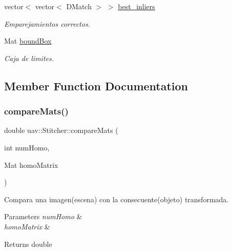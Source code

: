 \begin{DoxyCompactItemize}
vector$<$ vector$<$ D\+Match $>$ $>$ \mbox{\hyperlink{classuav_1_1Stitcher_a3aecc00facecd4f6952594b76cf4ea52}{best\+\_\+inliers}}
\begin{DoxyCompactList}\small\item\em Emparejamientos correctos. \end{DoxyCompactList}\item 
\mbox{\label{classuav_1_1Stitcher_a6f27d69501dd482cf217de22ca57fd13}} 
Mat \mbox{\hyperlink{classuav_1_1Stitcher_a6f27d69501dd482cf217de22ca57fd13}{bound\+Box}}
\begin{DoxyCompactList}\small\item\em Caja de limites. \end{DoxyCompactList}\end{DoxyCompactItemize}


\subsection{Member Function Documentation}
\mbox{\label{classuav_1_1Stitcher_a0745fd6db5669c1f9bce1b637c2be163}} 
\subsubsection{\texorpdfstring{compare\+Mats()}{compareMats()}}
{\footnotesize\ttfamily double uav\+::\+Stitcher\+::compare\+Mats (\begin{DoxyParamCaption}\item[{int}]{num\+Homo,  }\item[{Mat}]{homo\+Matrix }\end{DoxyParamCaption})\hspace{0.3cm}{\ttfamily [inline]}}



Compara una imagen(escena) con la consecuente(objeto) transformada. 


\begin{DoxyParams}{Parameters}
{\em num\+Homo} & \\
\hline
{\em homo\+Matrix} & \\
\hline
\end{DoxyParams}
\begin{DoxyReturn}{Returns}
double 
\end{DoxyReturn}
\mbox{\label{classuav_1_1Stitcher_a16bfb7a49f1e3a9c38ef03d72969094d}} 
